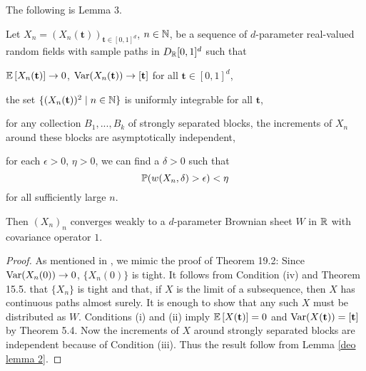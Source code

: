 The following is \cite{[16]deo1975functional} Lemma 3.
\begin{lemma} \label{deo lemma 3}
    Let $X_n = (X_n(\mathbf{t}))_{\mathbf{t} \in [0,1]^d}$, $n \in \mathbb{N}$, be a sequence of $d$-parameter real-valued random fields with sample paths in $D_{\mathbb{R}}[0,1]^d$ such that
    \begin{aufzii}
        \item $\mathbb{E}\left[X_n(\mathbf{t})\right] \to 0$, $\mathrm{Var}(X_n(\mathbf{t})) \to [\mathbf{t}]$ for all $\mathbf{t} \in [0,1]^d$,
        \item the set $\{ (X_n(\mathbf{t}))^2 \mid n \in \mathbb{N} \}$ is uniformly integrable for all $\mathbf{t}$,
        \item for any collection $B_1, ..., B_k$ of strongly separated blocks, the increments of $X_n$ around these blocks are asymptotically independent,
        \item for each $\epsilon > 0$, $\eta > 0$, we can find a $\delta > 0$ such that \[ \mathbb{P}(w(X_n, \delta) > \epsilon) < \eta \] for all sufficiently large $n$.
    \end{aufzii}
    Then $(X_n)_n$ converges weakly to a $d$-parameter Brownian sheet $W$ in $\mathbb{R}$ with covariance operator $1$.
\end{lemma}
\begin{proof}
    As mentioned in \cite{[16]deo1975functional}, we mimic the proof of \cite{[4]billingsley1968convergence} Theorem 19.2:
    Since $\mathrm{Var}(X_n(0)) \to 0$, $\{X_n(0)\}$ is tight. It follows from Condition (iv) and \cite{[4]billingsley1968convergence} Theorem 15.5. that $\{X_n\}$ is tight and that, if $X$ is the limit of a subsequence, then $X$ has continuous paths almost surely. It is enough to show that any such $X$ must be distributed as $W$.
    Conditions (i) and (ii) imply $\mathbb{E}\left[X(\mathbf{t})\right] = 0$ and $\mathrm{Var}(X(\mathbf{t})) = [\mathbf{t}]$ by \cite{[4]billingsley1968convergence} Theorem 5.4. Now the increments of $X$ around strongly separated blocks are independent because of Condition (iii). Thus the result follow from Lemma \ref{deo lemma 2}.
\end{proof}
